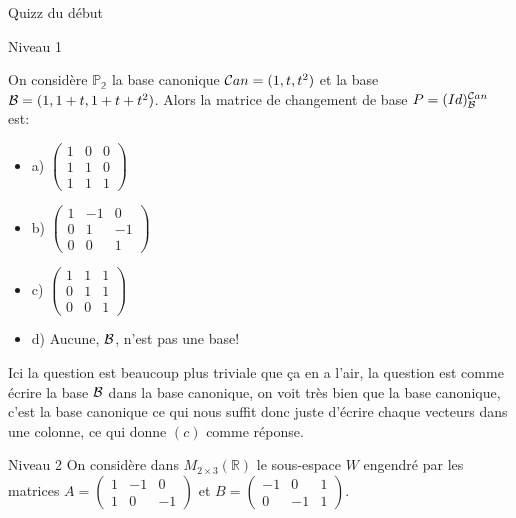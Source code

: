 
\begin{parag}{Quizz du début}
\begin{subparag}{Niveau 1}
    

    On considère $\mathbb{P_2}$ la base canonique $\mathcal{C} an = (1, t, t^2)$ et la base $\mathcal{B} = (1, 1 + t, 1 + t + t^2)$. Alors la matrice de changement de base $P = (Id)_{\mathcal{B}}^{\mathcal{C} an}$ est:
    \begin{itemize}
        \item a) $\begin{pmatrix}
            1 & 0 & 0\\
            1 & 1 & 0\\
            1 & 1 & 1
        \end{pmatrix}$
        \item b) $\begin{pmatrix}
            1 & -1 & 0 \\
            0 & 1 & -1\\
            0 & 0 & 1
        \end{pmatrix}$
        \item c) $\begin{pmatrix}
            1 & 1 & 1 \\
            0 & 1 & 1 \\
            0 & 0 & 1
        \end{pmatrix}$
        \item d) Aucune, $\mathcal{B}$, n'est pas une base!
    \end{itemize}
    Ici la question est beaucoup plus triviale que ça en a l'air, la question est comme écrire la base $\mathcal{B}$ dans la base canonique, on voit très bien que la base canonique, c'est la base canonique ce qui nous suffit donc juste d'écrire chaque vecteurs dans une colonne, ce qui donne $(c)$ comme réponse.
    \end{subparag}
    \begin{subparag}{Niveau 2}
        On considère dans $M_{2\times 3}(\mathbb{R})$ le sous-espace $W$ engendré par les matrices $A = \begin{pmatrix}
            1 & -1 & 0\\
            1 & 0 & -1
        \end{pmatrix}$ et $B = \begin{pmatrix}
            -1 & 0 & 1\\
            0 & -1 & 1
        \end{pmatrix}$.

\end{subparag}
\end{parag}
